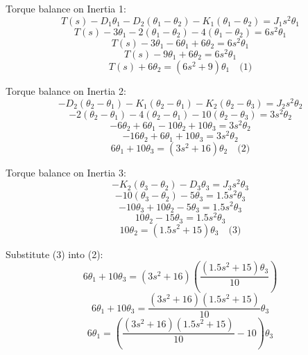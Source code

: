 \begin{figure}[!ht]
\end{figure}

Torque balance on Inertia 1:
\[
T(s) - D_1 \theta_1 - D_2(\theta_1 - \theta_2) - K_1(\theta_1 - \theta_2) = J_1 s^2 \theta_1
\]
\[
T(s) - 3\theta_1 - 2(\theta_1 - \theta_2) - 4(\theta_1 - \theta_2) = 6s^2 \theta_1
\]
\[
T(s) - 3\theta_1 - 6\theta_1 + 6\theta_2 = 6s^2 \theta_1
\]
\[
T(s) - 9\theta_1 + 6\theta_2 = 6s^2 \theta_1
\]
\[
T(s) + 6\theta_2 = (6s^2 + 9)\theta_1 \quad \text{(1)}
\]

Torque balance on Inertia 2:
\[
- D_2(\theta_2 - \theta_1) - K_1(\theta_2 - \theta_1) - K_2(\theta_2 - \theta_3) = J_2 s^2 \theta_2
\]
\[
- 2(\theta_2 - \theta_1) - 4(\theta_2 - \theta_1) - 10(\theta_2 - \theta_3) = 3s^2 \theta_2
\]
\[
-6\theta_2 + 6\theta_1 -10\theta_2 + 10\theta_3 = 3s^2 \theta_2
\]
\[
-16\theta_2 + 6\theta_1 + 10\theta_3 = 3s^2 \theta_2
\]
\[
6\theta_1 + 10\theta_3 = (3s^2 + 16)\theta_2 \quad \text{(2)}
\]

Torque balance on Inertia 3:
\[
- K_2(\theta_3 - \theta_2) - D_3 \theta_3 = J_3 s^2 \theta_3
\]
\[
-10(\theta_3 - \theta_2) - 5\theta_3 = 1.5s^2 \theta_3
\]
\[
-10\theta_3 + 10\theta_2 - 5\theta_3 = 1.5s^2 \theta_3
\]
\[
10\theta_2 - 15\theta_3 = 1.5s^2 \theta_3
\]
\[
10\theta_2 = (1.5s^2 + 15)\theta_3 \quad \text{(3)}
\]

Substitute (3) into (2):
\[
6\theta_1 + 10\theta_3 = (3s^2 + 16)\left( \frac{(1.5s^2 + 15)\theta_3}{10} \right)
\]
\[
6\theta_1 + 10\theta_3 = \frac{(3s^2 + 16)(1.5s^2 + 15)}{10} \theta_3
\]
\[
6\theta_1 = \left( \frac{(3s^2 + 16)(1.5s^2 + 15)}{10} - 10 \right) \theta_3
\]

